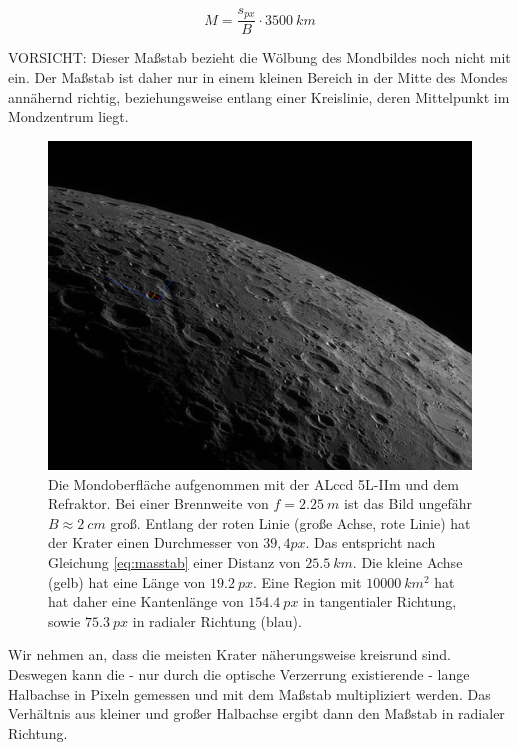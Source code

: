 \documentclass[10pt,a4paper,titlepage]{article}
\begin{document}
\begin{equation}
M = \frac{s_{px}}{B} \cdot \SI{3500}{km}
\label{eq:masstab}
\end{equation}

VORSICHT: Dieser Maßstab bezieht die Wölbung des Mondbildes noch nicht mit ein. Der Maßstab ist daher nur in einem kleinen Bereich in der Mitte des Mondes annähernd richtig, beziehungsweise entlang einer Kreislinie, deren Mittelpunkt im Mondzentrum liegt.

\begin{figure}[h!]
  \centering
    \includegraphics[width=1\textwidth]{Mondkrater}
  \caption{Die Mondoberfläche aufgenommen mit der ALccd 5L-IIm und dem Refraktor. Bei einer Brennweite von $f = \SI{2,25}{m}$ ist das Bild ungefähr $B \approx \SI{2}{cm}$ groß. Entlang der roten Linie (große Achse, rote Linie) hat der Krater einen Durchmesser von $39,4 px$. Das entspricht nach Gleichung \ref{eq:masstab} einer Distanz von $\SI{25,5}{km}$. Die kleine Achse (gelb) hat eine Länge von $\SI{19,2}{px}$. Eine Region mit $\SI{10000}{km^2}$ hat hat daher eine Kantenlänge von $\SI{154,4}{px}$ in tangentialer Richtung, sowie $\SI{75,3}{px}$ in radialer Richtung (blau).}
  \label{fig:mondkrater}
\end{figure}

Wir nehmen an, dass die meisten Krater näherungsweise kreisrund sind. Deswegen kann die - nur durch die optische Verzerrung existierende - lange Halbachse in Pixeln gemessen und mit dem Maßstab multipliziert werden. Das Verhältnis aus kleiner und großer Halbachse ergibt dann den Maßstab in radialer Richtung.
\end{document}

